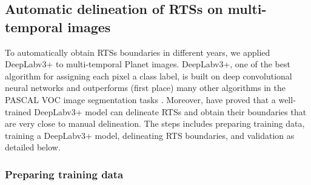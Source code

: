 \documentclass[authoryear,preprint,review,12pt]{elsarticle}
\begin{document}
\subsection{Automatic delineation of RTSs on multi-temporal images}
\label{sec_auto_delineating}

To automatically obtain RTSs boundaries in different years, we applied DeepLabv3+ to multi-temporal Planet images. 
DeepLabv3+, one of the best algorithm for assigning each pixel a class label, is built on deep convolutional neural networks \citep{chen2018encoder-decoder} and outperforms (first place) many other algorithms in the PASCAL VOC image segmentation tasks \citep{everingham2015The}.
Moreover, \cite{huang2020using} have proved that a well-trained DeepLabv3+ model can delineate RTSs and obtain their boundaries that are very close to manual delineation.
The steps includes preparing training data, training a DeepLabv3+ model, delineating RTS boundaries, and validation as detailed below. 


\subsubsection{Preparing training data} 
\label{sec_prepare_training}

\end{document}
